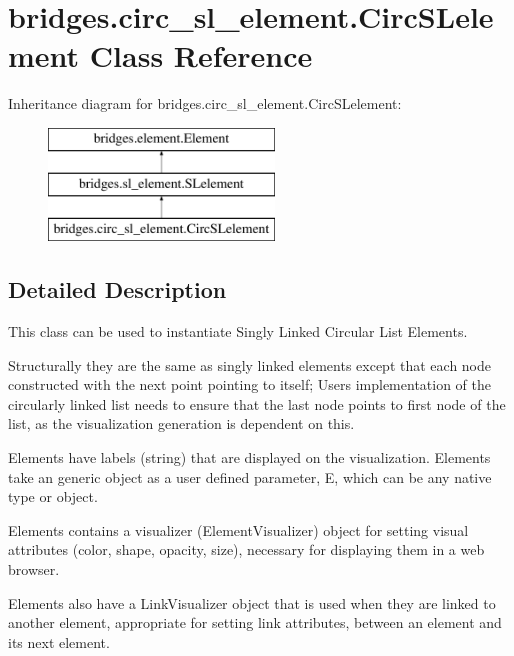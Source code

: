 \hypertarget{classbridges_1_1circ__sl__element_1_1_circ_s_lelement}{}\section{bridges.\+circ\+\_\+sl\+\_\+element.\+Circ\+S\+Lelement Class Reference}
\label{classbridges_1_1circ__sl__element_1_1_circ_s_lelement}
Inheritance diagram for bridges.\+circ\+\_\+sl\+\_\+element.\+Circ\+S\+Lelement\+:\begin{figure}[H]
\begin{center}
\leavevmode
\includegraphics[height=3.000000cm]{classbridges_1_1circ__sl__element_1_1_circ_s_lelement}
\end{center}
\end{figure}


\subsection{Detailed Description}
This class can be used to instantiate Singly Linked Circular List Elements. 

Structurally they are the same as singly linked elements except that each node constructed with the next point pointing to itself; User\textquotesingle{}s implementation of the circularly linked list needs to ensure that the last node points to first node of the list, as the visualization generation is dependent on this.

Elements have labels (string) that are displayed on the visualization. Elements take an generic object as a user defined parameter, E, which can be any native type or object.

Elements contains a visualizer (Element\+Visualizer) object for setting visual attributes (color, shape, opacity, size), necessary for displaying them in a web browser.

Elements also have a Link\+Visualizer object that is used when they are linked to another element, appropriate for setting link attributes, between an element and its next element.

